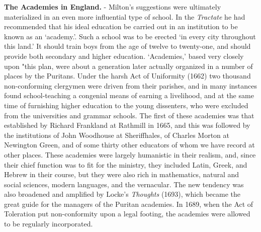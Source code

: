 \documentclass[
]{book}
\begin{document}
\textbf{The Academies in England.} - Milton's suggestions were ultimately materialized in an even more influential type of school. In the \emph{Tractate} he had recommended that his ideal education be carried out in an institution to be known as an `academy.'. Such a school was to be erected `in every city throughout this land.' It should train boys from the age of twelve to twenty-one, and should provide both secondary and higher education. `Academies,' based very closely upon "this plan, were about a generation later actually organized in a number of places by the Puritans. Under the harsh Act of Uniformity (1662) two thousand non-conforming clergymen were driven from their parishes, and in many instances found school-teaching a congenial means of earning a livelihood, and at the same time of furnishing higher education to the young dissenters, who were excluded from the universities and grammar schools. The first of these academies was that established by Richard Frankland at Rathmill in 1665, and this was followed by the institutions of John Woodhouse at Sheriffhales, of Charles Morton at Newington Green, and of some thirty other educators of whom we have record at other places. These academies were largely humanistic in their realism, and, since their chief function was to fit for the ministry, they included Latin, Greek, and Hebrew in their course, but they were also rich in mathematics, natural and social sciences, modern languages, and the vernacular. The new tendency was also broadened and amplified by Locke's \emph{Thoughts} (1693), which became the great guide for the managers of the Puritan academies. In 1689, when the Act of Toleration put non-conformity upon a legal footing, the academies were allowed to be regularly incorporated.
\end{document}
